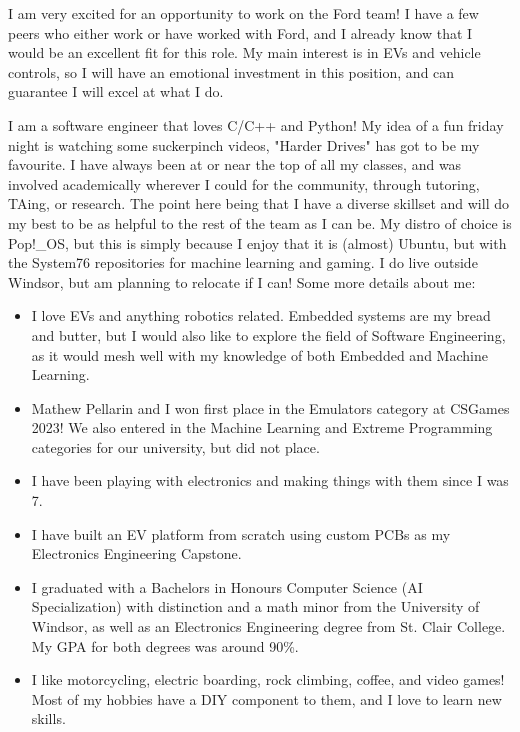 I am very excited for an opportunity to work on the Ford team! I have a few peers who either work or have worked with Ford, and I already know that I would be an excellent fit for this role. My main interest is in EVs and vehicle controls, so I will have an emotional investment in this position, and can guarantee I will excel at what I do.

I am a software engineer that loves C/C++ and Python! My idea of a fun friday night is watching some suckerpinch videos, "Harder Drives" has got to be my favourite. I have always been at or near the top of all my classes, and was involved academically wherever I could for the community, through tutoring, TAing, or research. The point here being that I have a diverse skillset and will do my best to be as helpful to the rest of the team as I can be. My distro of choice is Pop!\_OS, but this is simply because I enjoy that it is (almost) Ubuntu, but with the System76 repositories for machine learning and gaming. I do live outside Windsor, but am planning to relocate if I can! Some more details about me:

\begin{itemize}
  \item I love EVs and anything robotics related. Embedded systems are my bread and butter, but I would also like to explore the field of Software Engineering, as it would mesh well with my knowledge of both Embedded and Machine Learning.
  \item Mathew Pellarin and I won first place in the Emulators category at CSGames 2023! We also entered in the Machine Learning and Extreme Programming categories for our university, but did not place.
  \item I have been playing with electronics and making things with them since I was 7.
  \item I have built an EV platform from scratch using custom PCBs as my Electronics Engineering Capstone.
  \item I graduated with a Bachelors in Honours Computer Science (AI Specialization) with distinction and a math minor from the University of Windsor, as well as an Electronics Engineering degree from St. Clair College. My GPA for both degrees was around 90\%.
  \item I like motorcycling, electric boarding, rock climbing, coffee, and video games! Most of my hobbies have a DIY component to them, and I love to learn new skills.
\end{itemize}
